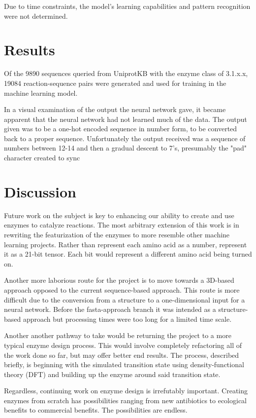 \documentclass[12pt]{article}
\begin{document}
Due to time constraints, the model's learning capabilities and pattern recognition
were not determined.

\section{Results}
Of the 9890 sequences queried from UniprotKB with the enzyme class of 3.1.x.x, 19084
reaction-sequence pairs were generated and used for training in the machine learning
model. 

In a visual examination of the output the neural network gave, it became apparent that
the neural network had not learned much of the data. The output given was to be a
one-hot encoded sequence in number form, to be converted back to a proper sequence. Unfortunately
the output received was a sequence of numbers between 12-14 and then a gradual descent
to 7's, presumably the "pad" character created to sync 

\section{Discussion}
Future work on the subject is key to enhancing our ability to create and use enzymes
to catalyze reactions. The most arbitrary extension of this work is in rewriting
the featurization of the enzymes to more resemble other machine learning projects.
Rather than represent each amino acid as a number, represent it as a 21-bit tensor.
Each bit would represent a different amino acid being turned on. 

Another more laborious route for the project is to move towards a 3D-based approach
opposed to the current sequence-based approach. This route is more difficult due
to the conversion from a structure to a one-dimensional input for a neural network.
Before the fasta-approach branch it was intended as a structure-based approach but
processing times were too long for a limited time scale.

Another another pathway to take would be returning the project to a more typical
enzyme design process. This would involve completely refactoring all of the work
done so far, but may offer better end results. The process, described briefly, is
beginning with the simulated transition state using density-functional theory (DFT)
and building up the enzyme around said transition state.

Regardless, continuing work on enzyme design is irrefutably important. Creating
enzymes from scratch has possibilities ranging from new antibiotics to ecological
benefits to commercial benefits. The possibilities are endless.

\printbibliography
\end{document}
